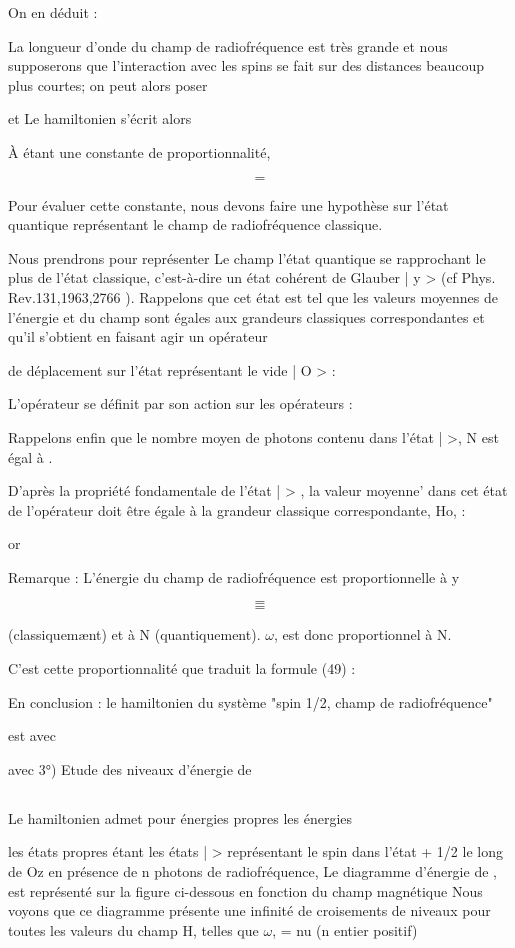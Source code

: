 On en déduit :

La longueur d'onde du champ de radiofréquence est très grande et nous supposerons
que l'interaction avec les spins se fait sur des distances beaucoup plus courtes;
 on peut alors poser 

et 
Le hamiltonien  s'écrit alors

À étant une constante de proportionnalité,


\[
\tag{49}=
\]

Pour évaluer cette constante, nous devons faire une hypothèse sur
l'état quantique représentant le champ de radiofréquence classique.

Nous prendrons pour représenter Le champ l'état quantique se rapprochant le plus de l'état
classique, c'est-à-dire un état cohérent de
Glauber | y > (cf Phys. Rev.131,1963,2766 ). Rappelons que cet état est tel
que les valeurs moyennes de l'énergie et du champ sont égales aux grandeurs
classiques correspondantes et qu'il s'obtient en faisant agir un opérateur

de déplacement  sur l'état représentant le vide | O > :

L'opérateur  se définit par son action sur les opérateurs  :

Rappelons enfin que le nombre moyen de photons contenu dans l'état |  >,
N est égal à .

D'après la propriété fondamentale de l'état |  > , la valeur moyenne’ dans cet état de
l'opérateur  doit être égale à la grandeur classique correspondante, Ho, :

or

Remarque : L'énergie du champ de radiofréquence est proportionnelle à y

\[
\tag{50-a}=
\]
\[
\tag{50-b}=
\]

(classiquemænt) et à N (quantiquement). $\omega$, est donc proportionnel à N.

C'est cette proportionnalité que traduit la formule (49) :

En conclusion : le hamiltonien du système "spin 1/2, champ de radiofréquence"

est
avec

avec
3°) Etude des niveaux d'énergie de
\subsection{}%
Le hamiltonien  admet pour énergies propres les énergies

les états propres étant les états |  > représentant le spin dans l'état
+ 1/2 le long de Oz en présence de n photons de radiofréquence,
Le diagramme d'énergie de , est représenté sur la figure ci-dessous en
fonction du champ magnétique 
Nous voyons que ce diagramme présente une infinité de croisements de
niveaux pour toutes les valeurs du champ H, telles que $\omega$, = nu (n entier positif)

